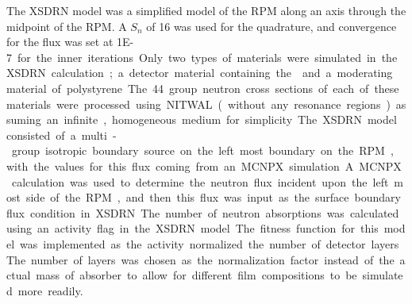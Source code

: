 The XSDRN model was a simplified model of the RPM along an axis through the midpoint of the RPM.
A $S_n$ of 16 was used for the quadrature, and convergence for the flux was set at \SI{1E-7} for the inner iterations.
Only two types of materials were simulated in the XSDRN calculation; a detector material containing the  and a moderating material of polystyrene.
The 44 group neutron cross sections of each of these materials were processed using NITWAL (without any resonance regions) assuming an infinite, homogeneous medium for simplicity.
The XSDRN model consisted of a multi-group isotropic boundary source on the left most boundary on the RPM, with the values for this flux coming from an MCNPX simulation.
A MCNPX calculation was used to determine the neutron flux incident upon the left most side of the RPM, and then this flux was input as the surface boundary flux condition in XSDRN.
The number of neutron absorptions was calculated using an activity flag in the XSDRN model.
The fitness function for this model was implemented as the activity normalized the number of detector layers.
The number of layers was chosen as the normalization factor instead of the actual mass of absorber to allow for different film compositions to be simulated more readily.
